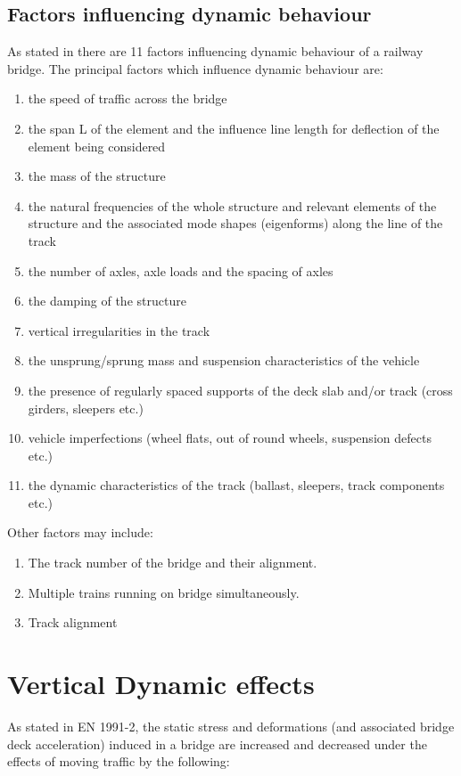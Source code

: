 \subsection{Factors influencing dynamic behaviour}
As stated in\cite[6.4.2]{EC12} there are 11 factors influencing dynamic behaviour of a railway bridge. The principal factors which influence dynamic behaviour are:
\begin{enumerate}[-]
	\item the speed of traffic across the bridge
	\item the span L of the element and the influence line length for deflection of the element being considered
	\item the mass of the structure
	\item the natural frequencies of the whole structure and relevant elements of the structure and the associated mode shapes (eigenforms) along the line of the track
	\item the number of axles, axle loads and the spacing of axles
	\item the damping of the structure
	\item vertical irregularities in the track
	\item the unsprung/sprung mass and suspension characteristics of the vehicle
	\item the presence of regularly spaced supports of the deck slab and/or track (cross girders, sleepers etc.)
	\item vehicle imperfections (wheel flats, out of round wheels, suspension defects etc.)
	\item the dynamic characteristics of the track (ballast, sleepers, track components etc.)
\end{enumerate}

Other factors may include:

\begin{enumerate}

	\item The track number of the bridge and their alignment. 
	\item Multiple trains running on bridge simultaneously. 
	\item Track alignment

\end{enumerate}



\section{Vertical Dynamic effects}
As stated in EN 1991-2\cite{EC12}, the static stress and deformations (and associated bridge deck acceleration) induced in a bridge are increased and decreased under the effects of moving traffic by the following:

